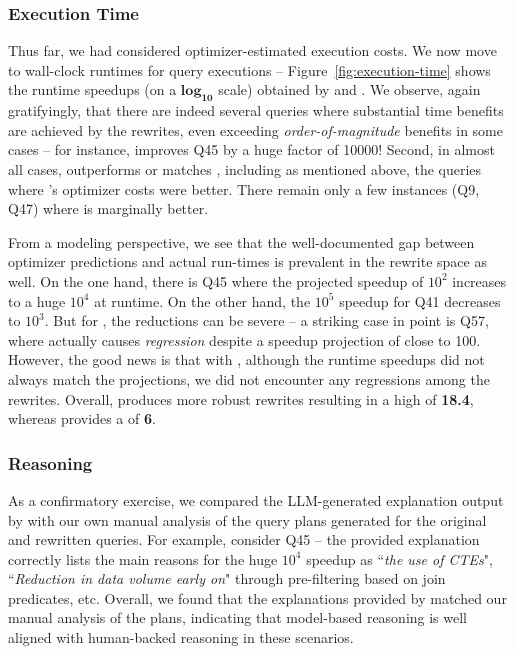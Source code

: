 \subsubsection{Execution Time}
\label{sec:execution-times}
%
Thus far, we had considered optimizer-estimated execution costs. We now move to wall-clock runtimes for query executions -- Figure~\ref{fig:execution-time} shows the runtime speedups (on a $\mathbf{log_{10}}$ scale) obtained by \lithe and \sota. 
%
We observe, again gratifyingly, that there are indeed several queries where substantial time benefits are achieved by the rewrites, even exceeding \emph{order-of-magnitude} benefits in some cases -- for instance, \lithe improves Q45 by a huge factor of 10000!
Second, in almost all cases, \lithe outperforms or matches \sota, including as mentioned above, the queries where \sota's optimizer costs were better. There remain only a few instances (Q9, Q47) where \sota is marginally better.


From a modeling perspective, we see that the well-documented gap between optimizer predictions and actual run-times is prevalent in the rewrite space as well. On the one hand, there is Q45 where the projected speedup of $10^2$ increases to a huge $10^4$ at runtime. On the other hand, the $10^5$ speedup for Q41 decreases to $10^3$.  But for \sota, the reductions can be severe -- a striking case in point is Q57, where \sota actually causes \emph{regression} despite a speedup projection of close to 100. 
%
However, the good news is that with \lithe, although the runtime speedups did not always match the projections, we did not encounter any regressions among the \cpr rewrites.
Overall, \lithe produces more robust rewrites resulting in a high \tsgm of \textbf{18.4}, whereas \sota provides a \tsgm of \textbf{6}.


\subsubsection{Reasoning}
%
As a confirmatory exercise, we compared the LLM-generated explanation output by \lithe with our own manual analysis of the query plans generated for the original and rewritten queries. 
%
For example, consider Q45 
-- the provided explanation correctly lists the main reasons for the huge $10^4$ speedup as ``\textit{the use of CTEs}", ``\textit{Reduction in data volume early on}" through pre-filtering based on join predicates, etc.
%
Overall, we found that the explanations provided by \lithe matched our manual analysis of the plans, indicating that model-based reasoning is well aligned with human-backed reasoning in these scenarios.

